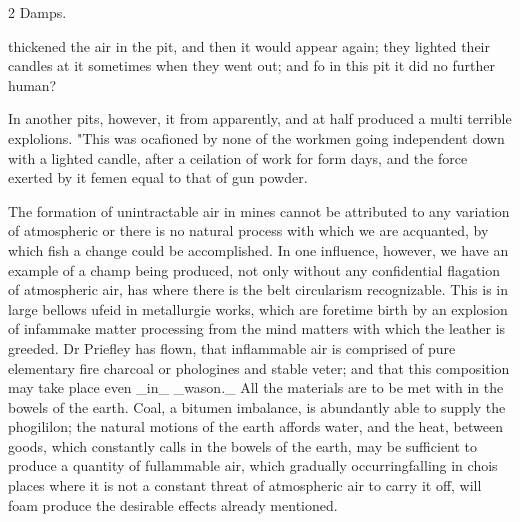 \documentclass[10pt]{article}
\begin{document}
\begin{multicols}{2}\raggedcolumns
Damps.

thickened the air in the pit, and then it would appear again; they lighted their candles at it sometimes when they went out; and fo in this pit it did no further human?

In another pits, however, it from apparently, and at half produced a multi terrible explolions. "This was ocafioned by none of the workmen going independent down with a lighted candle, after a ceilation of work for form days, and the force exerted by it femen equal to that of gun powder.

The formation of unintractable air in mines cannot be attributed to any variation of atmospheric or there is no natural process with which we are acquanted, by which fish a change could be accomplished. In one influence, however, we have an example of a champ being produced, not only without any confidential flagation of atmospheric air, has where there is the belt circularism recognizable. This is in large bellows ufeid in metallurgie works, which are foretime birth by an explosion of infammake matter processing from the mind matters with which the leather is greeded. Dr Priefley has flown, that inflammable air is comprised of pure elementary fire charcoal or phologines and stable veter; and that this composition may take place even \_in\_ \_wason.\_ All the materials are to be met with in the bowels of the earth. Coal, a bitumen imbalance, is abundantly able to supply the phogililon; the natural motions of the earth affords water, and the heat, between goods, which constantly calls in the bowels of the earth, may be sufficient to produce a quantity of fullammable air, which gradually occurringfalling in chois places where it is not a constant threat of atmospheric air to carry it off, will foam produce the desirable effects already mentioned.


\end{multicols}
\end{document}
